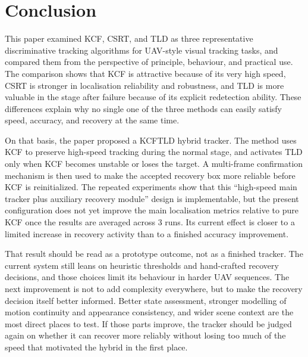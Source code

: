 \documentclass[12pt,a4paper]{article}
\begin{document}
\section{Conclusion}
This paper examined KCF, CSRT, and TLD as three representative discriminative tracking algorithms for UAV-style visual tracking tasks, and compared them from the perspective of principle, behaviour, and practical use. The comparison shows that KCF is attractive because of its very high speed, CSRT is stronger in localisation reliability and robustness, and TLD is more valuable in the stage after failure because of its explicit redetection ability. These differences explain why no single one of the three methods can easily satisfy speed, accuracy, and recovery at the same time.

On that basis, the paper proposed a KCF\textendash TLD hybrid tracker. The method uses KCF to preserve high-speed tracking during the normal stage, and activates TLD only when KCF becomes unstable or loses the target. A multi-frame confirmation mechanism is then used to make the accepted recovery box more reliable before KCF is reinitialized. The repeated experiments show that this ``high-speed main tracker plus auxiliary recovery module'' design is implementable, but the present configuration does not yet improve the main localisation metrics relative to pure KCF once the results are averaged across 3 runs. Its current effect is closer to a limited increase in recovery activity than to a finished accuracy improvement.

That result should be read as a prototype outcome, not as a finished tracker. The current system still leans on heuristic thresholds and hand-crafted recovery decisions, and those choices limit its behaviour in harder UAV sequences. The next improvement is not to add complexity everywhere, but to make the recovery decision itself better informed. Better state assessment, stronger modelling of motion continuity and appearance consistency, and wider scene context are the most direct places to test. If those parts improve, the tracker should be judged again on whether it can recover more reliably without losing too much of the speed that motivated the hybrid in the first place.

\printbibliography[title={References}]
\end{document}
